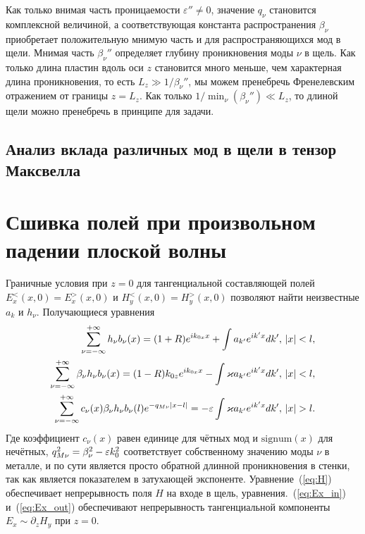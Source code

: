 Как только внимая часть проницаемости $\varepsilon'' \neq 0$, значение $q_\nu$ становится комплексной величиной, а соответствующая константа 
 распространения $\beta_\nu$ приобретает положительную мнимую часть и для распространяющихся мод в щели. Мнимая часть $\beta_\nu''$ определяет
 глубину проникновения моды $\nu$ в щель. Как только длина пластин вдоль оси $z$ становится много меньше, чем характерная длина проникновения, то 
 есть $L_z \gg 1/\beta_\nu''$, мы можем пренебречь Френелевским отражением от границы $z = L_z$. Как только $1/\min_{\nu}(\beta_\nu'') \ll L_z$,
 то длиной щели можно пренебречь в принципе для задачи. 

\subsection{Анализ вклада различных мод в щели в тензор Максвелла}

\section{Сшивка полей при произвольном падении плоской волны}

 Граничные условия при $z = 0$ для тангенциальной составляющей полей $E_x^<(x,0) = E_x^>(x,0) $ и $H_y^<(x,0) = H_y^>(x,0)$ 
 позволяют найти неизвестные $a_k$ и $h_\nu$. Получающиеся уравнения
\begin{align}
\sum_{\nu = -\infty}^{+\infty} h_\nu b_\nu (x) = (1+R)e^{ik_{0x}x} 
+ \int a_{k'} e^{ik'x} dk', & \ \abs{x}<l, \label{eq:H} \\
\sum_{\nu = -\infty}^{+\infty} \beta_\nu h_\nu b_\nu(x) = (1-R)k_{0z}e^{ik_{0x}x}
- \int \varkappa a_{k'} e^{ik'x} dk', &\ \abs{x}<l,  \label{eq:Ex_in} \\
\sum_{\nu = -\infty}^{+\infty} c_\nu(x)\beta_\nu h_\nu b_\nu(l) e^{-q_{M\nu}\abs{x-l}} = 
 -\eps \int \varkappa a_{k'} e^{ik'x} dk', &\ \abs{x}>l. \label{eq:Ex_out}
\end{align}
Где коэффициент $c_\nu(x)$ равен единице для чётных мод и $\text{signum}(x)$ для нечётных, $q_{M\nu}^2 = \beta_\nu^2 - \varepsilon k_0^2$
соответствует собственному значению моды $\nu$ в металле, и по сути является просто обратной длинной проникновения в стенки, так как 
является показателем в затухающей экспоненте. Уравнение~(\ref{eq:H}) обеспечивает непрерывность поля $H$ на входе в щель, 
уравнения.~(\ref{eq:Ex_in}) и~(\ref{eq:Ex_out}) обеспечивают непрерывность тангенциальной компоненты $E_x \sim \partial_{z} H_y$ при $z = 0$.

